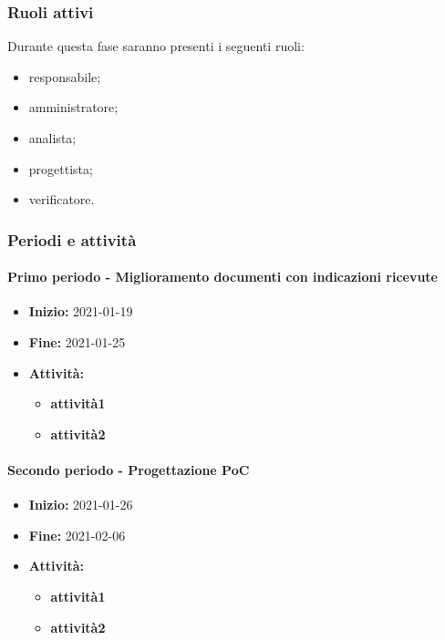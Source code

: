 \subsubsection{Ruoli attivi}
Durante questa fase saranno presenti i seguenti ruoli:
\begin{itemize}
    \item responsabile;
    \item amministratore;
    \item analista;
    \item progettista;
    \item verificatore.
\end{itemize}

\subsubsection{Periodi e attività}

\paragraph[Primo periodo]{Primo periodo - \textnormal{Miglioramento documenti con indicazioni ricevute}}
\begin{itemize}
    \item [] \textbf{Inizio:} 2021-01-19
    \item [] \textbf{Fine:} 2021-01-25
    \item [] \textbf{Attività:}
          \begin{itemize}
              \item \textbf{attività1}
              \item \textbf{attività2}
          \end{itemize}
\end{itemize}

\paragraph[Secondo periodo]{Secondo periodo - \textnormal{Progettazione PoC}}
\begin{itemize}
    \item [] \textbf{Inizio:} 2021-01-26
    \item [] \textbf{Fine:} 2021-02-06
    \item [] \textbf{Attività:}
          \begin{itemize}
              \item \textbf{attività1}
              \item \textbf{attività2}
          \end{itemize}
\end{itemize}

